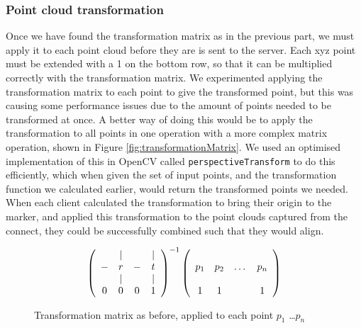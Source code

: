 \documentclass{article}
\begin{document}
\subsubsection{Point cloud transformation}
Once we have found the transformation matrix as in the previous part, we must apply it to each point cloud before they are is sent to the server. Each xyz point must be extended with a 1 on the bottom row, so that it can be multiplied correctly with the transformation matrix. We experimented applying the transformation matrix to each point to give the transformed point, but this was causing some performance issues due to the amount of points needed to be transformed at once. A better way of doing this would be to apply the transformation to all points in one operation with a more complex matrix operation, shown in Figure \ref{fig:transformationMatrix}. We used an optimised implementation of this in OpenCV called \texttt{perspectiveTransform} to do this efficiently, which when given the set of input points, and the transformation function we calculated earlier, would return the transformed points we needed. When each client calculated the transformation to bring their origin to the marker, and applied this transformation to the point clouds captured from the connect, they could be successfully combined such that they would align.\\
\begin{figure}[h]
  \[\left(\begin{array}{cccc}
      & | &   & | \\
    - & r & - & t \\ 
      & | &   & | \\
    0 & 0 & 0 & 1
    \end{array}\right)^{-1}
  \left(\begin{array}{cccc}
    \multirow{3}{*}{\textbf{$p_1$}} & \multirow{3}{*}{\textbf{$p_2$}} & \multirow{3}{*}{\dots} & \multirow{3}{*}{\textbf{$p_n$}} \\
    & & & \\
    & & & \\
    1 & 1 & & 1
    \end{array}\right)\]
  \caption{Transformation matrix as before, applied to each point $p_1$ \dots $p_n$}
  \label{fig:transformationApplication}
\end{figure}
\end{document}

